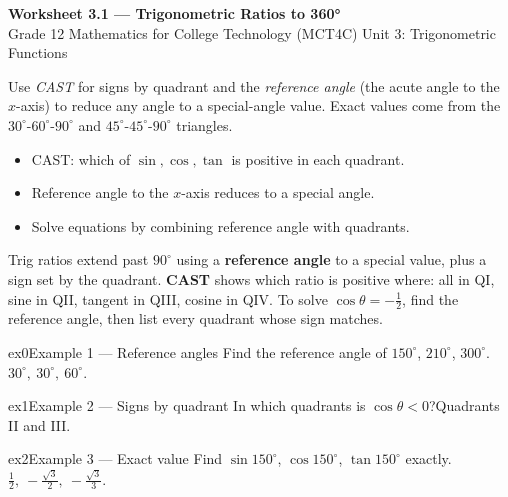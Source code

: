 \documentclass[11pt]{article}
\begin{document}
\begin{center}
{\LARGE\bfseries\color{titleblue}Worksheet 3.1 --- Trigonometric Ratios to 360°}\\[2pt]
{\small Grade 12 Mathematics for College Technology (MCT4C) \textperiodcentered{} Unit 3: Trigonometric Functions}
\end{center}

\begin{ideabox}
Use \emph{CAST} for signs by quadrant and the \emph{reference angle} (the acute angle to the $x$-axis) to reduce any angle to a special-angle value. Exact values come from the $30^\circ$-$60^\circ$-$90^\circ$ and $45^\circ$-$45^\circ$-$90^\circ$ triangles.
\begin{itemize}[leftmargin=*,itemsep=2pt]
  \item CAST: which of $\sin,\cos,\tan$ is positive in each quadrant.
  \item Reference angle to the $x$-axis reduces to a special angle.
  \item Solve equations by combining reference angle with quadrants.
\end{itemize}
\end{ideabox}

\begin{learnbox}
Trig ratios extend past $90^\circ$ using a \textbf{reference angle} to a special value, plus a sign set by the quadrant.
\textbf{CAST} shows which ratio is positive where: all in QI, sine in QII, tangent in QIII, cosine in QIV.
To solve $\cos\theta=-\tfrac12$, find the reference angle, then list every quadrant whose sign matches.
\end{learnbox}


\begin{example}{ex0}{Example 1 --- Reference angles}
Find the reference angle of $150^\circ$, $210^\circ$, $300^\circ$.\soln $30^\circ,\ 30^\circ,\ 60^\circ$.
\end{example}

\begin{example}{ex1}{Example 2 --- Signs by quadrant}
In which quadrants is $\cos\theta<0$?\soln Quadrants II and III.
\end{example}

\begin{example}{ex2}{Example 3 --- Exact value}
Find $\sin150^\circ$, $\cos150^\circ$, $\tan150^\circ$ exactly.\soln $\tfrac12,\ -\tfrac{\sqrt3}{2},\ -\tfrac{\sqrt3}{3}$.
\end{example}
\end{document}
